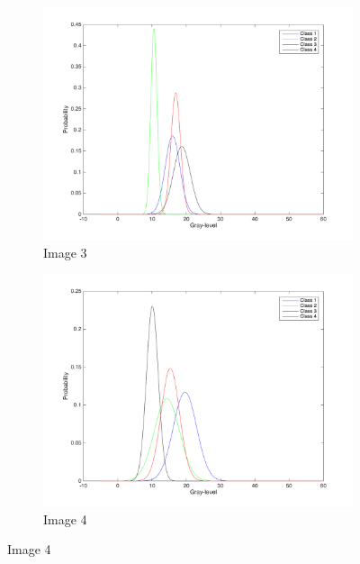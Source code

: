 \documentclass[12pt,a4paper]{report}
\begin{document}
\begin{figure}[!ht]
	\begin{subfigure}{0.5\textwidth}
	\centering
	\includegraphics[width=1.0\textwidth]{Feature3ProbabilityDistribution}	
	\caption*{Image 3}
	\end{subfigure} 
	\begin{subfigure}{0.5\textwidth}
	\centering
	\includegraphics[width=1.0\textwidth]{Feature4ProbabilityDistribution}	
	\caption*{Image 4}
	\end{subfigure}
\end{figure}
\end{document}
